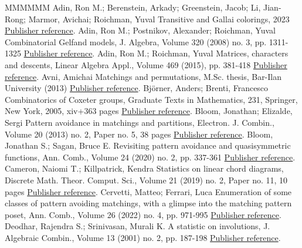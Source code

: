 \begin{thebibliography}{MMMMMM}
 Adin, Ron M.; Berenstein, Arkady; Greenstein, Jacob; Li, Jian-Rong; Marmor, Avichai; Roichman, Yuval Transitive and Gallai colorings, 2023 \href{https://alco.centre-mersenne.org/articles/10.5802/alco.351/#gallai}{Publisher reference}.
 Adin, Ron M.; Postnikov, Alexander; Roichman, Yuval Combinatorial Gelfand models, J. Algebra, Volume 320 (2008) no. 3, pp. 1311-1325 \href{https://alco.centre-mersenne.org/articles/10.5802/alco.351/#gelfand_involutions}{Publisher reference}.
 Adin, Ron M.; Roichman, Yuval Matrices, characters and descents, Linear Algebra Appl., Volume 469 (2015), pp. 381-418 \href{https://alco.centre-mersenne.org/articles/10.5802/alco.351/#adin_roichman_fine_set}{Publisher reference}.
 Avni, Amichai Matchings and permutations, M.Sc. thesis, Bar-Ilan University (2013) \href{https://alco.centre-mersenne.org/articles/10.5802/alco.351/#avni_perfect_matchings}{Publisher reference}.
 Björner, Anders; Brenti, Francesco Combinatorics of Coxeter groups, Graduate Texts in Mathematics, 231, Springer, New York, 2005, xiv+363 pages \href{https://alco.centre-mersenne.org/articles/10.5802/alco.351/#bjorner2005combinatorics}{Publisher reference}.
 Bloom, Jonathan; Elizalde, Sergi Pattern avoidance in matchings and partitions, Electron. J. Combin., Volume 20 (2013) no. 2, Paper no. 5, 38 pages \href{https://alco.centre-mersenne.org/articles/10.5802/alco.351/#bloom2013pattern}{Publisher reference}.
 Bloom, Jonathan S.; Sagan, Bruce E. Revisiting pattern avoidance and quasisymmetric functions, Ann. Comb., Volume 24 (2020) no. 2, pp. 337-361 \href{https://alco.centre-mersenne.org/articles/10.5802/alco.351/#BloomSagan}{Publisher reference}.
 Cameron, Naiomi T.; Killpatrick, Kendra Statistics on linear chord diagrams, Discrete Math. Theor. Comput. Sci., Volume 21 (2019) no. 2, Paper no. 11, 10 pages \href{https://alco.centre-mersenne.org/articles/10.5802/alco.351/#killpatrick2020statistics}{Publisher reference}.
 Cervetti, Matteo; Ferrari, Luca Enumeration of some classes of pattern avoiding matchings, with a glimpse into the matching pattern poset, Ann. Comb., Volume 26 (2022) no. 4, pp. 971-995 \href{https://alco.centre-mersenne.org/articles/10.5802/alco.351/#cervetti2022enumeration}{Publisher reference}.
 Deodhar, Rajendra S.; Srinivasan, Murali K. A statistic on involutions, J. Algebraic Combin., Volume 13 (2001) no. 2, pp. 187-198 \href{https://alco.centre-mersenne.org/articles/10.5802/alco.351/#deodhar2001statistic}{Publisher reference}.

\end{thebibliography}
